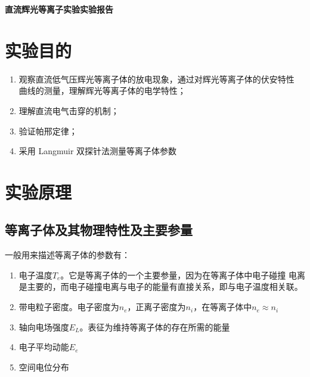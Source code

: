 \documentclass[a4paper,UTF8]{ctexart}
\begin{document}
\begin{center}
    \textbf{\Large 直流辉光等离子实验实验报告}
    \par {}
\end{center}

\section{实验目的}

\begin{enumerate}
    \item 观察直流低气压辉光等离子体的放电现象，通过对辉光等离子体的伏安特性
曲线的测量，理解辉光等离子体的电学特性；
    \item 理解直流电气击穿的机制；
    \item 验证帕邢定律；
    \item 采用 Langmuir 双探针法测量等离子体参数
\end{enumerate}

\section{实验原理}

\subsection{等离子体及其物理特性及主要参量}

一般用来描述等离子体的参数有：

\begin{enumerate}
    \item 电子温度$T_e$。它是等离子体的一个主要参量，因为在等离子体中电子碰撞
电离是主要的，而电子碰撞电离与电子的能量有直接关系，即与电子温度相关联。
    \item 带电粒子密度。电子密度为$n_e$，正离子密度为$n_i$，在等离子体中$n_e \approx n_i$
    \item 轴向电场强度$E_L$。表征为维持等离子体的存在所需的能量
    \item 电子平均动能$E_e$
    \item 空间电位分布
\end{enumerate}
\end{document}
